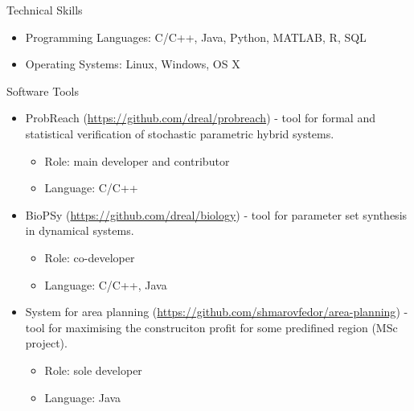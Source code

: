 \documentclass{resume} %
\begin{document}
\pagebreak

\begin{rSection}{Technical Skills}
\begin{itemize}
	\item Programming Languages: C/C++, Java, Python, MATLAB, R, SQL
	\item Operating Systems: Linux, Windows, OS X
\end{itemize}
\end{rSection}


\begin{rSection}{Software Tools}
\begin{itemize}
	\item ProbReach (\url{https://github.com/dreal/probreach}) - tool for formal and statistical
	verification of stochastic parametric hybrid systems.
	\begin{itemize}
		\item Role: main developer and contributor
		\item Language: C/C++
	\end{itemize}
	\item BioPSy (\url{https://github.com/dreal/biology}) - tool for parameter set synthesis
	in dynamical systems.
	\begin{itemize}
		\item Role: co-developer
		\item Language: C/C++, Java
	\end{itemize}
	\item System for area planning (\url{https://github.com/shmarovfedor/area-planning}) - 
	tool for maximising the construciton profit for some predifined region (MSc project).
	\begin{itemize}
		\item Role: sole developer
		\item Language: Java
	\end{itemize}
\end{itemize}
\end{rSection}
\end{document}
